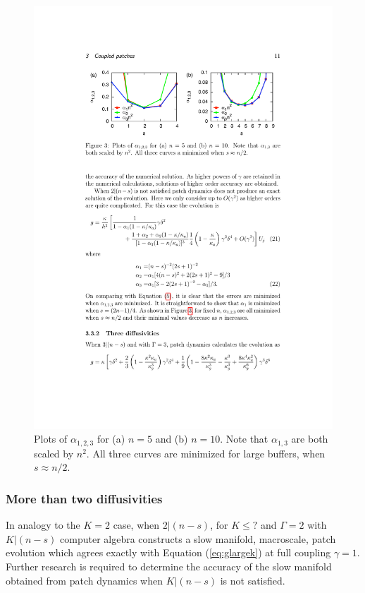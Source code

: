 \documentclass[12pt,a4paper]{article}
\begin{document}
\begin{figure}
\begin{center}
\includegraphics[width=13cm]{alpha}
\caption{Plots of $\alpha_{1,2,3}$ for (a) $n=5$ and (b) $n=10$. Note that $\alpha_{1,3}$ are both scaled by $n^2$. All three curves are minimized for large buffers, when $s\approx n/2$.}
\label{fig:alpha}
\end{center}
\end{figure}

\subsubsection{More than two diffusivities}

In analogy to the $K=2$ case, when $2|(n-s)$, for $K\leq ?$ and $\Gamma=2$ with $K|(n-s)$ computer algebra constructs a slow manifold, macroscale, patch evolution which agrees exactly with Equation (\ref{eq:glargek}) at full coupling $\gamma=1$. Further research is required to determine the accuracy of the slow manifold obtained from patch dynamics when $K|(n-s)$ is not satisfied.
\end{document}
